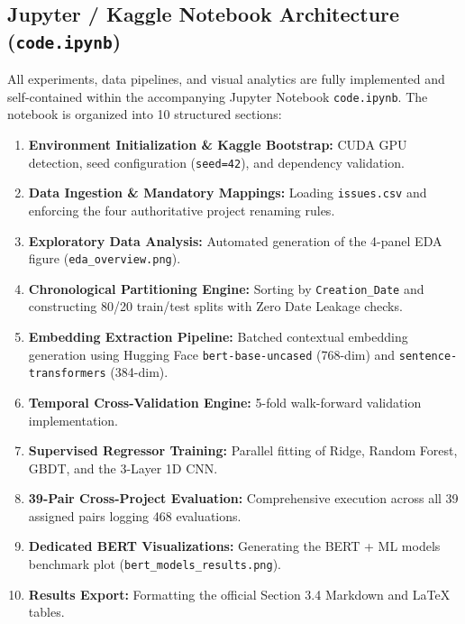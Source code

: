\documentclass[11pt,a4paper]{article}
\begin{document}
\subsection{Jupyter / Kaggle Notebook Architecture (\texttt{code.ipynb})}
All experiments, data pipelines, and visual analytics are fully implemented and self-contained within the accompanying Jupyter Notebook \texttt{code.ipynb}. The notebook is organized into 10 structured sections:
\begin{enumerate}[itemsep=0.1em]
    \item \textbf{Environment Initialization \& Kaggle Bootstrap:} CUDA GPU detection, seed configuration (\texttt{seed=42}), and dependency validation.
    \item \textbf{Data Ingestion \& Mandatory Mappings:} Loading \texttt{issues.csv} and enforcing the four authoritative project renaming rules.
    \item \textbf{Exploratory Data Analysis:} Automated generation of the 4-panel EDA figure (\texttt{eda\_overview.png}).
    \item \textbf{Chronological Partitioning Engine:} Sorting by \texttt{Creation\_Date} and constructing 80/20 train/test splits with Zero Date Leakage checks.
    \item \textbf{Embedding Extraction Pipeline:} Batched contextual embedding generation using Hugging Face \texttt{bert-base-uncased} (768-dim) and \texttt{sentence-transformers} (384-dim).
    \item \textbf{Temporal Cross-Validation Engine:} 5-fold walk-forward validation implementation.
    \item \textbf{Supervised Regressor Training:} Parallel fitting of Ridge, Random Forest, GBDT, and the 3-Layer 1D CNN.
    \item \textbf{39-Pair Cross-Project Evaluation:} Comprehensive execution across all 39 assigned pairs logging 468 evaluations.
    \item \textbf{Dedicated BERT Visualizations:} Generating the BERT + ML models benchmark plot (\texttt{bert\_models_results.png}).
    \item \textbf{Results Export:} Formatting the official Section 3.4 Markdown and LaTeX tables.
\end{enumerate}

\end{document}
